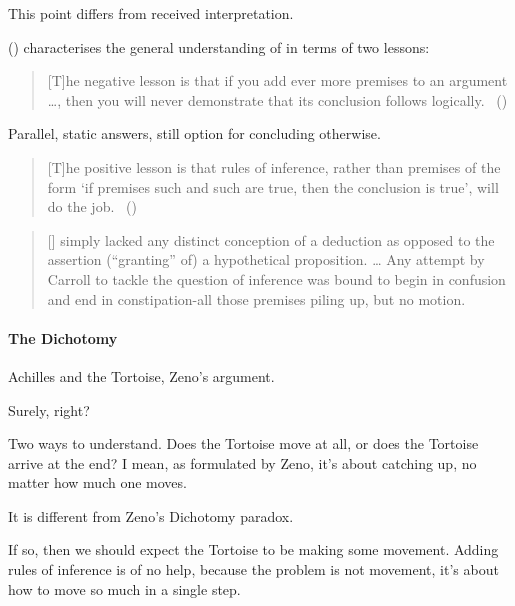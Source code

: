 \begin{note}
  This point differs from received interpretation.

  \citeauthor{Wieland:2013vf} (\citeyear{Wieland:2013vf}) characterises the general understanding of \textcite{Carroll:1895uj} in terms of two lessons:
  \begin{quote}
    [T]he negative lesson is that if you add ever more premises to an argument \dots, then you will never demonstrate that its conclusion follows logically.\newline
    \mbox{ }\hfill\mbox{(\citeyear[984]{Wieland:2013vf})}
  \end{quote}

  Parallel, static answers, still option for concluding otherwise.

  \begin{quote}
    [T]he positive lesson is that rules of inference, rather than premises of the form `if premises such and such are true, then the conclusion is true', will do the job.\newline
    \mbox{ }\hfill\mbox{(\citeyear[984]{Wieland:2013vf})}
  \end{quote}

  \begin{quote}
    [\citeauthor{Carroll:1895uj}] simply lacked any distinct conception of a deduction as opposed to the assertion (``granting'' of) a hypothetical proposition.
    \dots
    Any attempt by Carroll to tackle the question of inference was bound to begin in confusion and end in constipation-all those premises piling up, but no motion.
  \end{quote}
\end{note}

\paragraph{The Dichotomy}

\begin{note}
  Achilles and the Tortoise, Zeno's argument.

  Surely, right?

  Two ways to understand.
  Does the Tortoise move at all, or does the Tortoise arrive at the end?
  I mean, as formulated by Zeno, it's about catching up, no matter how much one moves.

  It is different from Zeno's Dichotomy paradox.


  If so, then we should expect the Tortoise to be making some movement.
  Adding rules of inference is of no help, because the problem is not movement, it's about how to move so much in a single step.
\end{note}


